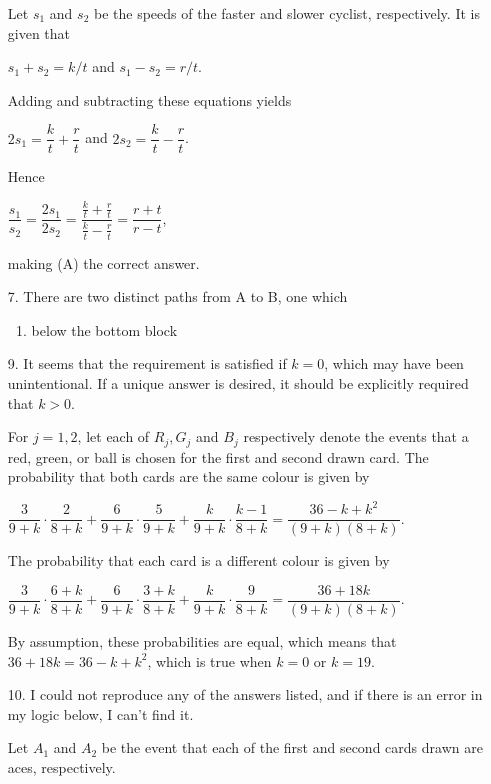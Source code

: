 \documentclass[11pt,fleqn,dvipsnames,usenames]{article}
\begin{document}
\begin{enumerate}
Let $s_{1}$ and $s_{2}$ be the speeds of the faster and slower cyclist, respectively.  It is given that
\begin{center}
$s_{1} + s_{2} = k/t$ and $s_{1} - s_{2} = r/t$.
\end{center}
Adding and subtracting these equations yields
\begin{center}
$2s_{1} = \dfrac{k}{t} + \dfrac{r}{t}$ and $2s_{2} = \dfrac{k}{t} - \dfrac{r}{t}$.
\end{center}
Hence
\begin{center}
$\dfrac{s_{1}}{s_{2}} = \dfrac{2s_{1}}{2s_{2}} = \dfrac{\frac{k}{t} + \frac{r}{t}}{\frac{k}{t} - \frac{r}{t}} = \dfrac{r+t}{r-t}$,
\end{center}
making (A) the correct answer.

\item[7.] There are two distinct paths from A to B, one which 
\begin{enumerate}[(1)]
\item below the bottom block
\end{enumerate}
\item[9.] It seems that the requirement is satisfied if $k=0$, which may have been unintentional.  If a unique answer is desired, it should be explicitly required that $k>0$.

For $j=1,2$, let each of $R_{j}, G_{j}$ and $B_{j}$ respectively denote the events that a red, green, or ball is chosen for the first and second drawn card.  The probability that both cards are the same colour is given by
\begin{center}
$\dfrac{3}{9+k}\cdot\dfrac{2}{8 + k} + \dfrac{6}{9+k}\cdot\dfrac{5}{9+k} + \dfrac{k}{9+k}\cdot\dfrac{k-1}{8+k} = \dfrac{36 - k + k^2}{(9+k)(8+k)}$.
\end{center}
%
The probability that each card is a different colour is given by
\begin{center}
$\dfrac{3}{9+k}\cdot \dfrac{6+k}{8+k} + \dfrac{6}{9+k}\cdot \dfrac{3+k}{8+k} + \dfrac{k}{9+k}\cdot \dfrac{9}{8+k} = \dfrac{36 + 18k}{(9+k)(8+k)}$.
\end{center}
By assumption, these probabilities are equal, which means that $36 + 18k = 36 - k + k^2$, which is true when $k = 0$ or $k=19$.

\item[10.] \note I could not reproduce any of the answers listed, and if there is an error in my logic below, I can't find it.

Let $A_{1}$ and $A_{2}$ be the event that each of the first and second cards drawn are aces, respectively.


\end{enumerate}
\end{document}
